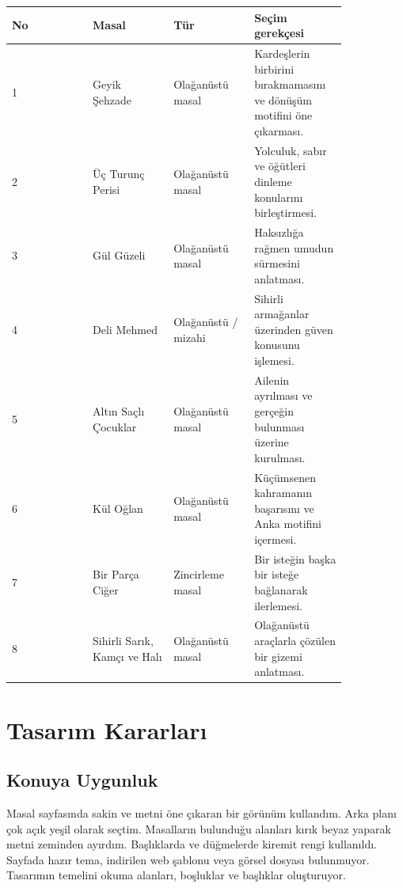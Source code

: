 \documentclass[11pt,a4paper]{article}
\begin{document}
\begin{longtable}{|p{0.21\linewidth}|p{0.21\linewidth}|p{0.21\linewidth}|p{0.21\linewidth}|}
\hline \textbf{No} & \textbf{Masal} & \textbf{Tür} & \textbf{Seçim gerekçesi} \\ \hline\endhead
1 & Geyik Şehzade & Olağanüstü masal & Kardeşlerin birbirini bırakmamasını ve dönüşüm motifini öne çıkarması. \\ \hline
2 & Üç Turunç Perisi & Olağanüstü masal & Yolculuk, sabır ve öğütleri dinleme konularını birleştirmesi. \\ \hline
3 & Gül Güzeli & Olağanüstü masal & Haksızlığa rağmen umudun sürmesini anlatması. \\ \hline
4 & Deli Mehmed & Olağanüstü / mizahi & Sihirli armağanlar üzerinden güven konusunu işlemesi. \\ \hline
5 & Altın Saçlı Çocuklar & Olağanüstü masal & Ailenin ayrılması ve gerçeğin bulunması üzerine kurulması. \\ \hline
6 & Kül Oğlan & Olağanüstü masal & Küçümsenen kahramanın başarısını ve Anka motifini içermesi. \\ \hline
7 & Bir Parça Ciğer & Zincirleme masal & Bir isteğin başka bir isteğe bağlanarak ilerlemesi. \\ \hline
8 & Sihirli Sarık, Kamçı ve Halı & Olağanüstü masal & Olağanüstü araçlarla çözülen bir gizemi anlatması. \\ \hline
\end{longtable}
\newpage
\section{Tasarım Kararları}
\subsection{Konuya Uygunluk}
Masal sayfasında sakin ve metni öne çıkaran bir görünüm kullandım. Arka planı çok açık yeşil olarak seçtim. Masalların bulunduğu alanları kırık beyaz yaparak metni zeminden ayırdım. Başlıklarda ve düğmelerde kiremit rengi kullanıldı. Sayfada hazır tema, indirilen web şablonu veya görsel dosyası bulunmuyor. Tasarımın temelini okuma alanları, boşluklar ve başlıklar oluşturuyor.
\end{document}
